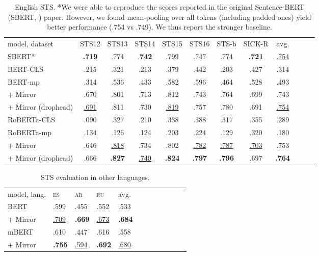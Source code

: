 \documentclass[11pt]{article}
\newcommand{\es}{{\textsc{es}}\xspace}
\newcommand{\ru}{{\textsc{ru}}\xspace}
\newcommand{\ar}{{\textsc{ar}}\xspace}
\begin{document}
\begin{table*}[!t] \centering
\small
\begin{tabular}{l ccccccccccc}
\cmidrule[1.0pt]{1-10}
model, dataset  & STS12 & STS13 & STS14 & STS15 & STS16 & STS-b & SICK-R & avg.\\
\cmidrule[1.0pt]{1-10}
SBERT* & \textbf{.719} & .774 &.\textbf{742} & .799 & .747 & .774 & \textbf{.721} & \underline{.754} \\
\cmidrule[1.0pt]{1-10}
BERT-CLS & .215 & .321 & .213 & .379 & .442 & .203 & .427 & .314 \\
BERT-mp & .314 & .536 & .433 & .582 & .596 & .464 & .528 & .493 \\
\rowcolor{blue!10}
+ Mirror & .670	& .801 & .713 & .812 & .743	& .764	& .699	& .743 \\
\rowcolor{blue!10}
+ Mirror (drophead) & \underline{.691}	& .811	& .730	& \underline{.819}	& .757	& .780	& .691 & \underline{.754} \\
\cmidrule[1.0pt]{1-10}
RoBERTa-CLS & .090 & .327 & .210 &.338 & .388 & .317 & .355 & .289 \\
RoBERTa-mp & .134 & .126 & .124 & .203 & .224 & .129 & .320 & .180 \\
\rowcolor{blue!10}
+ Mirror & .646	& \underline{.818}	& .734	& .802	& \underline{.782}	& \underline{.787} & \underline{.703} & .753 \\
\rowcolor{blue!10}
+ Mirror (drophead) & .666	& \textbf{.827}	& \underline{.740} & \textbf{.824}	& \textbf{.797}	& \textbf{.796}	& .697	& \textbf{.764} \\
\bottomrule
\end{tabular}
\caption{English STS. *We were able to reproduce the scores reported in the original Sentence-BERT (SBERT, \citealt{reimers2019sentence}) paper. However, we found mean-pooling over all tokens (including padded ones) yield better performance (.754 vs .749). We thus report the stronger baseline.}
\label{tab:sts_sota_full}
\end{table*}


\begin{table}[!t]
\centering
\scriptsize
\def\arraystretch{0.8}
\begin{tabularx}{\linewidth}{lXXXXXXXXXXX}
\cmidrule[1.0pt]{1-10}
model, lang.  & \es & \ar & \ru & avg. \\
\cmidrule[1.0pt]{1-10}
BERT & .599 & .455 & .552 & .533 \\
\rowcolor{blue!10}
+ Mirror & \underline{.709} & \textbf{.669} & \underline{.673} & \textbf{.684} \\
\cmidrule[1.0pt]{1-10}
mBERT & .610 & .447 & .616 & .558 \\
\rowcolor{blue!10}
 + Mirror & \textbf{.755} & \underline{.594} & \textbf{.692}  & \underline{.680} \\
\cmidrule[1.0pt]{1-10}
\end{tabularx}
\caption{STS evaluation in other languages.}
\label{tab:sts_multillingual}
\end{table}
\end{document}

